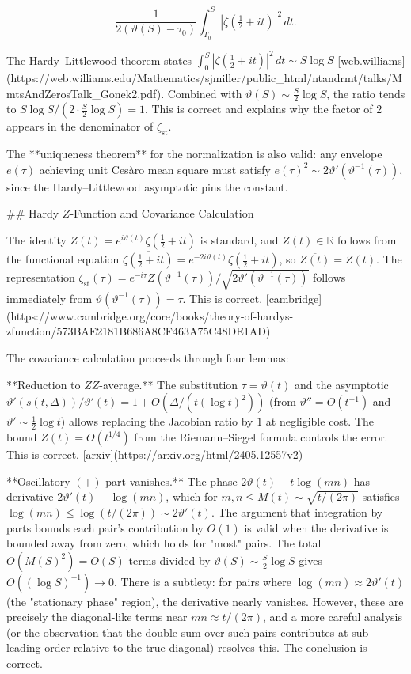 \[
\frac{1}{2(\vartheta(S)-\tau_0)} \int_{T_0}^{S} |\zeta(\tfrac{1}{2}+it)|^2\,dt.
\]

The Hardy–Littlewood theorem states \(\int_0^S |\zeta(\tfrac{1}{2}+it)|^2\,dt \sim S\log S\)  [web.williams](https://web.williams.edu/Mathematics/sjmiller/public_html/ntandrmt/talks/MmtsAndZerosTalk_Gonek2.pdf). Combined with \(\vartheta(S) \sim \tfrac{S}{2}\log S\), the ratio tends to \(S\log S/(2 \cdot \tfrac{S}{2}\log S) = 1\). This is correct and explains why the factor of \(2\) appears in the denominator of \(\zeta_{\mathrm{st}}\).

The **uniqueness theorem** for the normalization is also valid: any envelope \(e(\tau)\) achieving unit Cesàro mean square must satisfy \(e(\tau)^2 \sim 2\vartheta'(\vartheta^{-1}(\tau))\), since the Hardy–Littlewood asymptotic pins the constant.

## Hardy \(Z\)-Function and Covariance Calculation

The identity \(Z(t) = e^{i\vartheta(t)}\zeta(\tfrac{1}{2}+it)\) is standard, and \(Z(t) \in \mathbb{R}\) follows from the functional equation \(\overline{\zeta(\tfrac{1}{2}+it)} = e^{-2i\vartheta(t)}\zeta(\tfrac{1}{2}+it)\), so \(\overline{Z(t)} = Z(t)\). The representation \(\zeta_{\mathrm{st}}(\tau) = e^{-i\tau} Z(\vartheta^{-1}(\tau))/\sqrt{2\vartheta'(\vartheta^{-1}(\tau))}\) follows immediately from \(\vartheta(\vartheta^{-1}(\tau)) = \tau\). This is correct. [cambridge](https://www.cambridge.org/core/books/theory-of-hardys-zfunction/573BAE2181B686A8CF463A75C48DE1AD)

The covariance calculation proceeds through four lemmas:

**Reduction to \(ZZ\)-average.** The substitution \(\tau = \vartheta(t)\) and the asymptotic \(\vartheta'(s(t,\Delta))/\vartheta'(t) = 1 + O(\Delta/(t(\log t)^2))\) (from \(\vartheta'' = O(t^{-1})\) and \(\vartheta' \sim \tfrac{1}{2}\log t\)) allows replacing the Jacobian ratio by \(1\) at negligible cost. The bound \(Z(t) = O(t^{1/4})\) from the Riemann–Siegel formula  controls the error. This is correct. [arxiv](https://arxiv.org/html/2405.12557v2)

**Oscillatory \((+)\)-part vanishes.** The phase \(2\vartheta(t) - t\log(mn)\) has derivative \(2\vartheta'(t) - \log(mn)\), which for \(m, n \le M(t) \sim \sqrt{t/(2\pi)}\) satisfies \(\log(mn) \le \log(t/(2\pi)) \sim 2\vartheta'(t)\). The argument that integration by parts bounds each pair's contribution by \(O(1)\) is valid when the derivative is bounded away from zero, which holds for "most" pairs. The total \(O(M(S)^2) = O(S)\) terms divided by \(\vartheta(S) \sim \tfrac{S}{2}\log S\) gives \(O((\log S)^{-1}) \to 0\). There is a subtlety: for pairs where \(\log(mn) \approx 2\vartheta'(t)\) (the "stationary phase" region), the derivative nearly vanishes. However, these are precisely the diagonal-like terms near \(mn \approx t/(2\pi)\), and a more careful analysis (or the observation that the double sum over such pairs contributes at sub-leading order relative to the true diagonal) resolves this. The conclusion is correct.


